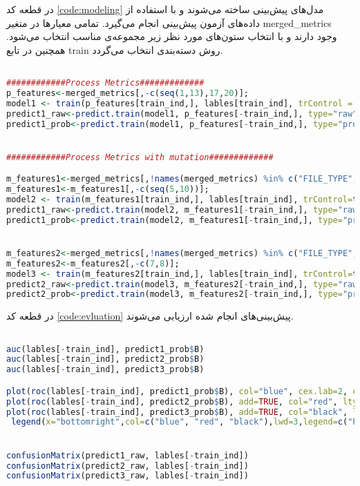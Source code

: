 \label{code:clean}
در قطعه کد \ref{code:modeling} مدل‌های پیش‌بینی ساخته می‌شوند و با استفاده از داده‌های آزمون پیش‌بینی انجام می‌گیرد. تمامی معیارها در متغیر merged\_metrics وجود دارند و با انتخاب ستون‌های مورد نظر زیر مجموعه‌ی مناسب انتخاب می‌شود. همچنین در تابع train روش دسته‌بندی انتخاب می‌گردد.

\begin{latin}
	\begin{lstlisting}[language=R]

############Process Metrics#############
p_features<-merged_metrics[,-c(seq(1,13),17,20)];
model1 <- train(p_features[train_ind,], lables[train_ind], trControl = train_control, method="nnet");
predict1_raw<-predict.train(model1, p_features[-train_ind,], type="raw")
predict1_prob<-predict.train(model1, p_features[-train_ind,], type="prob")


############Process Metrics with mutation#############

m_features1<-merged_metrics[,!names(merged_metrics) %in% c("FILE_TYPE","MetricId","FileType","FileInfoId","FILE_INFO_ID")];
m_features1<-m_features1[,-c(seq(5,10))];
model2 <- train(m_features1[train_ind,], lables[train_ind], trControl=train_control, method="nnet");
predict1_raw<-predict.train(model2, m_features1[-train_ind,], type="raw")
predict1_prob<-predict.train(model2, m_features1[-train_ind,], type="prob")


m_features2<-merged_metrics[,!names(merged_metrics) %in% c("FILE_TYPE","MetricId","FileType","FileInfoId","FILE_INFO_ID")];
m_features2<-m_features2[,-c(7,8)];
model3 <- train(m_features2[train_ind,], lables[train_ind], trControl=train_control, method="nnet");
predict2_raw<-predict.train(model3, m_features2[-train_ind,], type="raw")
predict2_prob<-predict.train(model3, m_features2[-train_ind,], type="prob")

	\end{lstlisting}
\end{latin}
\label{code:modeling}
در قطعه کد \ref{code:evluation} پیش‌بینی‌های انجام شده ارزیابی می‌شوند.

\begin{latin}
	\begin{lstlisting}[language=R]

auc(lables[-train_ind], predict1_prob$B)
auc(lables[-train_ind], predict2_prob$B)
auc(lables[-train_ind], predict3_prob$B)

plot(roc(lables[-train_ind], predict1_prob$B), col="blue", cex.lab=2, cex.axis=1.5);
plot(roc(lables[-train_ind], predict2_prob$B), add=TRUE, col="red", lty=2);
plot(roc(lables[-train_ind], predict3_prob$B), add=TRUE, col="black", lty=4);
 legend(x="bottomright",col=c("blue", "red", "black"),lwd=3,legend=c("Process","Process & Mutation", "Process & Mutation Base"),bty="6", lty=c(1,2,4), cex = 1.5)


confusionMatrix(predict1_raw, lables[-train_ind])
confusionMatrix(predict2_raw, lables[-train_ind])
confusionMatrix(predict3_raw, lables[-train_ind])

	\end{lstlisting}
\end{latin}
\label{code:evluation}
